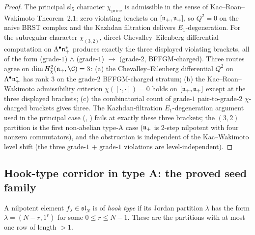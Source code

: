 \begin{proof}
The principal sl$_5$ character $\chi_{\mathrm{princ}}$ is admissible
in the sense of Kac--Roan--Wakimoto \cite{KRW03} Theorem~2.1: zero
violating brackets on $[\mathfrak{n}_+, \mathfrak{n}_+]$, so $Q^2 = 0$ on the naive
BRST complex and the Kazhdan filtration delivers $E_1$-degeneration.
For the subregular character $\chi_{(3,2)}$, direct Chevalley--Eilenberg
differential computation on $\Lambda^\bullet \mathfrak{n}_+^\ast$ produces
exactly the three displayed violating brackets, all of the form
(grade-$1$) $\wedge$ (grade-$1$) $\to$ (grade-$2$, BFFGM-charged).
Three routes agree on $\dim H^2_\chi(\fn_+, \C) = 3$:
(a) the Chevalley--Eilenberg differential $Q^2$ on
$\Lambda^\bullet \mathfrak{n}_+^\ast$ has rank $3$ on the grade-$2$ BFFGM-charged
stratum;
(b) the Kac--Roan--Wakimoto admissibility criterion
$\chi([\cdot,\cdot]) = 0$ holds on $[\mathfrak{n}_+, \mathfrak{n}_+]$ except at the
three displayed brackets;
(c) the combinatorial count of grade-$1$ pair-to-grade-$2$
$\chi$-charged brackets gives three.
The Kazhdan-filtration $E_1$-degeneration argument used in the
principal case (\cite{Arakawa07Wcoset}, \cite{KRW03}) fails at exactly
these three brackets; the $(3, 2)$ partition is the first non-abelian
type-A case ($\mathfrak{n}_+$ is $2$-step nilpotent with four nonzero
commutators), and the obstruction is independent of the
Kac--Wakimoto level shift (the three grade-$1$ + grade-$1$
violations are level-independent).
\end{proof}

\subsection{Hook-type corridor in type A: the proved seed family}

\begin{definition}
A nilpotent element $f_\lambda \in \mathfrak{sl}_N$ is of
\emph{hook type} if its Jordan partition $\lambda$ has the form
$\lambda = (N - r, 1^r)$ for some $0 \leq r \leq N - 1$. These are
the partitions with at most one row of length $> 1$.
\end{definition}

